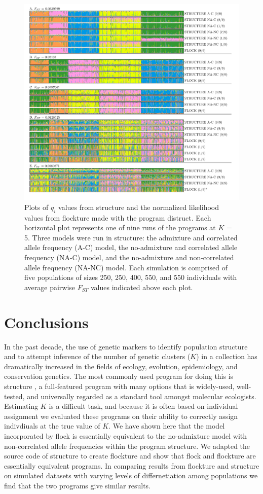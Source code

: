  \begin{figure}
\centering
  \includegraphics[width=.8\linewidth]{images/Figures-Pat/FlockturevStructureDistruct.pdf}
  \caption{Plots of $q_i$ values from {\sc structure} and the normalized likelihood values from
  {\sc flockture} made with the program {\sc distruct}. Each horizontal plot represents one of nine 
 runs of the programs  at $K$ = 5. Three models were run in structure: the admixture and correlated allele 
  frequency (A-C) model, 
the no-admixture and correlated allele frequency (NA-C) model, 
and the no-admixture and non-correlated allele frequency (NA-NC) model. Each simulation is comprised of
 five populations of sizes 250, 250, 400, 550, and 550 individuals with average pairwise $F_{ST}$ values
 indicated above each plot.}
  \label{fig:FvSdistruct}
\end{figure}

\section*{Conclusions}
In the past decade, the use of genetic markers to identify population structure and to attempt inference of
the number of genetic clusters ($K$) in a collection has dramatically increased in the fields of ecology, evolution, 
epidemiology, and conservation
genetics. The most commonly used program for doing this is {\sc structure} \citep{Pritchardetal2000,Falushetal2003}, 
a full-featured program with many options that is widely-used, well-tested, and universally regarded as a standard tool amongst molecular ecologists. 
Estimating $K$ is a difficult task, and because it is often based on individual assignment we 
evaluated these programs on their ability to correctly assign indivdiuals at the true value
of $K$. We have shown here that the model incorporated by {\sc flock} is essentially equivalent to the no-admixture model 
with non-correlated allele frequencies within the program {\sc structure}. 
We adapted the source code of {\sc structure} to create {\sc flockture} and show that
 {\sc flock} and {\sc flockture} are essentially equivalent programs. 
In comparing results from {\sc flockture} and {\sc structure} 
on simulated datasets with varying levels of differnetiation among populations
we find that the two programs give similar results.

